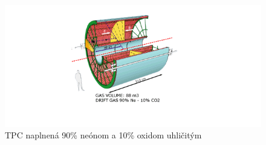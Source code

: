 \documentclass[thesismargins, thesislinespacing]{rnthesis}
\begin{document}
\begin{figure}[hbtp!]
	\begin{center}
		\includegraphics[width=\textwidth]{./Obrazky_praca/tpc.png}
		\caption{TPC naplnená 90\% neónom a 10\% oxidom uhličitým~\cite{TPCobr}}
		\label{tpc}
	\end{center}
\end{figure}



\end{document}
